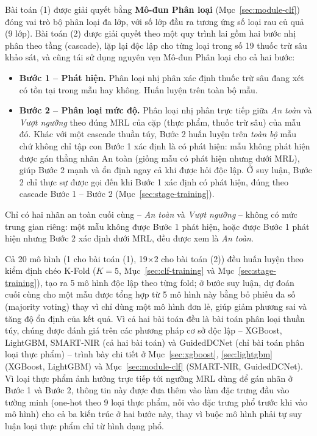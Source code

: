 \documentclass[10pt,twocolumn,twoside]{article}
\begin{document}
Bài toán (1) được giải quyết bằng \textbf{Mô-đun Phân loại}
(Mục~\ref{sec:module-clf}) đóng vai trò bộ phân loại đa lớp, với số lớp đầu
ra tương ứng số loại rau củ quả (9 lớp). Bài toán (2) được giải quyết theo
một quy trình lai gồm hai bước nhị phân theo tầng (cascade), lặp lại độc lập
cho từng loại trong số 19 thuốc trừ sâu khảo sát, và cũng tái sử dụng nguyên
vẹn Mô-đun Phân loại cho cả hai bước:
\begin{itemize}
\setlength{\itemsep}{1pt}
\item \textbf{Bước 1 -- Phát hiện.} Phân loại nhị phân xác định thuốc trừ
sâu đang xét có tồn tại trong mẫu hay không. Huấn luyện trên toàn bộ mẫu.
\item \textbf{Bước 2 -- Phân loại mức độ.} Phân loại nhị phân trực tiếp
giữa \emph{An toàn} và \emph{Vượt ngưỡng} theo đúng MRL của cặp (thực phẩm,
thuốc trừ sâu) của mẫu đó. Khác với một cascade thuần túy, Bước 2 huấn
luyện trên \emph{toàn bộ} mẫu chứ không chỉ tập con Bước 1 xác định là có
phát hiện: mẫu không phát hiện được gán thẳng nhãn An toàn (giống mẫu có
phát hiện nhưng dưới MRL), giúp Bước 2 mạnh và ổn định ngay cả khi được hỏi
độc lập. Ở suy luận, Bước 2 chỉ thực sự được gọi đến khi Bước 1 xác định có
phát hiện, đúng theo cascade Bước 1 -- Bước 2 (Mục~\ref{sec:stage-training}).
\end{itemize}
Chỉ có hai nhãn an toàn cuối cùng -- \emph{An toàn} và \emph{Vượt ngưỡng} --
không có mức trung gian riêng: một mẫu không được Bước 1 phát hiện, hoặc
được Bước 1 phát hiện nhưng Bước 2 xác định dưới MRL, đều được xem là
\emph{An toàn}.

Cả 20 mô hình (1 cho bài toán (1), 19$\times$2 cho bài toán (2)) đều huấn
luyện theo kiểm định chéo K-Fold ($K=5$, Mục~\ref{sec:clf-training} và
Mục~\ref{sec:stage-training}), tạo ra 5 mô hình độc lập theo từng fold; ở
bước suy luận, dự đoán cuối cùng cho một mẫu được tổng hợp từ 5 mô hình này
bằng bỏ phiếu đa số (majority voting) thay vì chỉ dùng một mô hình đơn lẻ,
giúp giảm phương sai và tăng độ ổn định của kết quả. Vì cả hai bài toán đều
là bài toán phân loại thuần túy, chúng được đánh giá trên các phương pháp
cơ sở độc lập -- XGBoost, LightGBM, SMART-NIR (cả hai bài toán) và GuidedDCNet
(chỉ bài toán phân loại thực phẩm) -- trình bày chi tiết ở
Mục~\ref{sec:xgboost}, \ref{sec:lightgbm} (XGBoost, LightGBM) và
Mục~\ref{sec:module-clf} (SMART-NIR, GuidedDCNet). Vì loại thực
phẩm ảnh hưởng trực
tiếp tới ngưỡng MRL dùng để gán nhãn ở Bước 1 và Bước 2, thông tin này được
đưa thêm vào làm đặc trưng đầu vào tường minh (one-hot theo 9 loại thực
phẩm, nối vào đặc trưng phổ trước khi vào mô hình) cho cả ba kiến trúc ở
hai bước này, thay vì buộc mô hình phải tự suy luận loại thực phẩm chỉ từ
hình dạng phổ.
\end{document}
